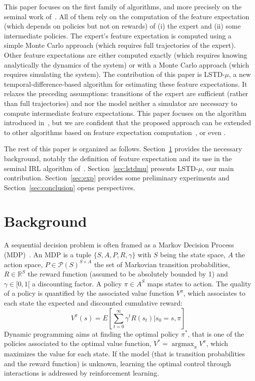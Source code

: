 \documentclass{jfpda2011}
\newcommand{\argmax}{\operatorname*{argmax}} %
\begin{document}
This paper focuses on the first family of algorithms, and more
precisely on the seminal work of~\citet{abbeel2004apprenticeship}. All of them
rely on the computation of the feature expectation (which depends on
policies but not on rewards) of (i) the expert and (ii) some
intermediate policies. The expert's feature expectation is computed
using a simple Monte Carlo approach (which requires full
trajectories of the expert). Other feature expectations are either
computed exactly (which requires knowing analytically the dynamics
of the system) or with a Monte Carlo approach (which requires simulating the system). The contribution of this paper is LSTD-$\mu$,
a new temporal-difference-based algorithm for estimating these feature
expectations. It relaxes the preceding assumptions: transitions
of the expert are sufficient (rather than full trajectories) and nor
the model neither a simulator are necessary to compute intermediate
feature expectations. This paper focuses on the algorithm introduced
in~\citep{abbeel2004apprenticeship}, but we are confident that the proposed
approach can be extended to other algorithms based on feature
expectation computation~\citep{syed2008apprenticeship,syed2008game,ziebart2008maximum}, or even \citep{ratliff2006maximum,ratliff2007imitation,ratliff2007boosting}.

The rest of this paper is organized as follows.
Section~\ref{sec:back} provides the necessary background,
notably the definition of feature expectation and its use in the
seminal IRL algorithm of~\citet{abbeel2004apprenticeship}.
Section~\ref{sec:lstdmu} presents LSTD-$\mu$, our main contribution.
Section~\ref{sec:exp} provides some preliminary experiments and
Section~\ref{sec:conclusion} opens perspectives.


\section{Background}
\label{sec:back}
A sequential decision problem is often framed as a Markov Decision
Process (MDP)~\citep{puterman1994markov}. An MDP is a tuple
$\{S,A,P,R,\gamma\}$ with $S$ being the state space, $A$ the action
space, $P\in\mathcal{P}(S)^{S\times A}$ the set of Markovian
transition probabilities, $R\in\mathbb{R}^S$ the reward function
(assumed to be absolutely bounded by 1) and $\gamma\in[0,1[$ a
discounting factor. A policy $\pi\in A^S$ maps states to action. The
quality of a policy is quantified by the associated value function
$V^\pi$, which associates to each state the expected and discounted
cumulative reward:
\begin{equation}
  V^\pi(s) = E[\sum_{t=0}^\infty \gamma^t R(s_t)|s_0=s, \pi]
\end{equation}
Dynamic programming aims at finding the optimal policy $\pi^*$, that
is one of the policies associated to the optimal value function,
$V^* = \argmax_\pi V^\pi$, which maximizes the value for each state.
If the model (that is transition probabilities and the reward
function) is unknown, learning the optimal control through
interactions is addressed by reinforcement learning.
\end{document}
